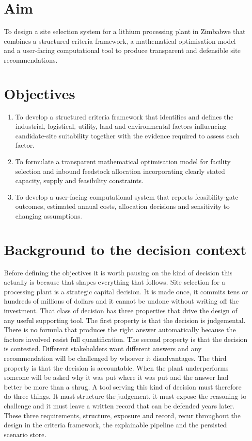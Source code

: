 \documentclass[12pt,a4paper]{report}
\begin{document}
\section{Aim}
To design a site selection system for a lithium processing plant in
Zimbabwe that combines a structured criteria framework, a mathematical
optimisation model and a user-facing computational tool to produce
transparent and defensible site recommendations.

\section{Objectives}
\begin{enumerate}[leftmargin=1.5em]
  \item To develop a structured criteria framework that identifies and
    defines the industrial, logistical, utility, land and environmental
    factors influencing candidate-site suitability together with the
    evidence required to assess each factor.
  \item To formulate a transparent mathematical optimisation model for
    facility selection and inbound feedstock allocation incorporating
    clearly stated capacity, supply and feasibility constraints.
  \item To develop a user-facing computational system that reports
    feasibility-gate outcomes, estimated annual costs, allocation
    decisions and sensitivity to changing assumptions.
\end{enumerate}

\section{Background to the decision context}
Before defining the objectives it is worth pausing on the kind of
decision this actually is because that shapes everything that follows.
Site selection for a processing plant is a strategic capital decision.
It is made once, it commits tens or hundreds of millions of dollars
and it cannot be undone without writing off the investment. That
class of decision has three properties that drive the design of any
useful supporting tool. The first property is that the decision is
judgemental. There is no formula that produces the right answer
automatically because the factors involved resist full
quantification. The second property is that the decision is contested.
Different stakeholders want different answers and any recommendation
will be challenged by whoever it disadvantages. The third property is
that the decision is accountable. When the plant underperforms
someone will be asked why it was put where it was put and the answer
had better be more than a shrug. A tool serving this kind of decision
must therefore do three things. It must structure the judgement, it
must expose the reasoning to challenge and it must leave a written
record that can be defended years later. These three requirements,
structure, exposure and record, recur throughout the design in the
criteria framework, the explainable pipeline and the persisted
scenario store.
\end{document}
